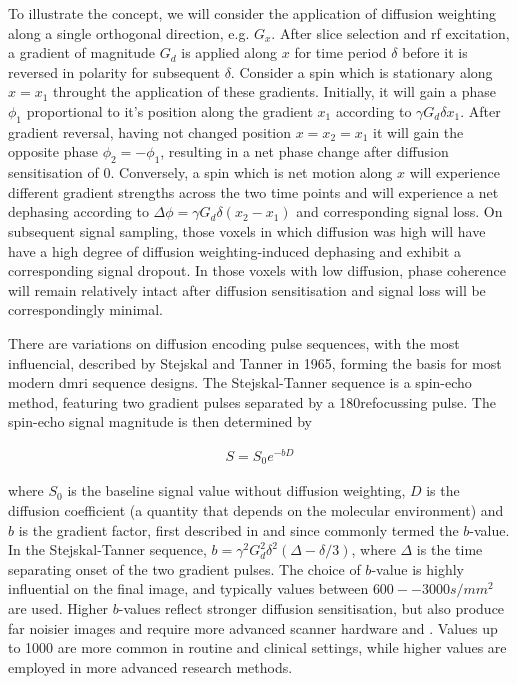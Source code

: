 To illustrate the concept, we will consider the application of diffusion weighting along a single orthogonal direction, e.g. $G_x$.
After slice selection and \gls{rf} excitation, a gradient of magnitude $G_d$ is applied along $x$ for time period $\delta$ before it is reversed in polarity for subsequent $\delta$.
Consider a spin which is stationary along $x=x_1$ throught the application of these gradients.
Initially, it will gain a phase $\phi_1$ proportional to it's position along the gradient $x_1$ according to $\gamma G_d \delta x_1$.
After gradient reversal, having not changed position $x=x_2=x_1$ it will gain the opposite phase $\phi_2 = -\phi_1$, resulting in a net phase change after diffusion sensitisation of $0$.
Conversely, a spin which is net motion along $x$ will experience different gradient strengths across the two time points and will experience a net dephasing according to $\Delta\phi = \gamma G_d \delta (x_2 - x_1)$  and corresponding signal loss.
On subsequent signal sampling, those voxels in which diffusion was high will have have a high degree of diffusion weighting-induced dephasing and exhibit a corresponding signal dropout.
In those voxels with low diffusion, phase coherence will remain relatively intact after diffusion sensitisation and signal loss will be correspondingly minimal.

There are variations on diffusion encoding pulse sequences, with the most influencial, described by Stejskal and Tanner  in 1965, forming the basis for most modern \gls{dmri} sequence designs.
The Stejskal-Tanner sequence is a spin-echo method, featuring two gradient pulses separated by a 180\textdegree refocussing pulse.
The spin-echo signal magnitude is then determined by

\begin{align}
    S = S_0e^{-bD}
\end{align}\label{eq:S}

where $S_0$ is the baseline signal value without diffusion weighting, $D$ is the  diffusion coefficient (a quantity that depends on the molecular environment) and $b$ is the gradient factor, first described in \autocite{LeBihan1991}  and since commonly termed the $b$-value.
In the Stejskal-Tanner sequence, $b = \gamma^2 G_d^2 \delta^2 (\Delta-\delta/3)$, where $\Delta$ is the time separating onset of the two gradient pulses.
The choice of $b$-value is highly influential on the final image, and typically values between $600--3000 s/mm^2$ are used.
Higher $b$-values reflect stronger diffusion sensitisation, but also produce far noisier images and require more advanced scanner hardware and .
Values up to 1000 are more common in routine and clinical settings, while higher values are employed in more advanced research methods.

